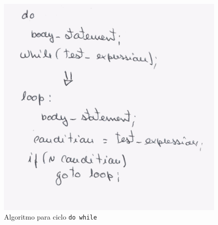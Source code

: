 \begin{figure}[htpb]
	\centering
	\includegraphics[scale=0.75]{./report/img/dowhile.png}
	\caption{Algoritmo para ciclo \texttt{do while}}
\label{fig:figure1}
\end{figure}

